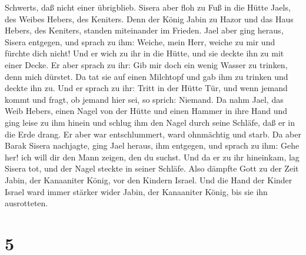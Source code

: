 Schwerts, daß nicht einer übrigblieb.  Sisera aber floh zu
Fuß in die Hütte Jaels, des Weibes Hebers, des Keniters. Denn der König
Jabin zu Hazor und das Haus Hebers, des Keniters, standen miteinander im
Frieden.  Jael aber ging heraus, Sisera entgegen, und
sprach zu ihm: Weiche, mein Herr, weiche zu mir und fürchte dich nicht!
Und er wich zu ihr in die Hütte, und sie deckte ihn zu mit einer Decke.
 Er aber sprach zu ihr: Gib mir doch ein wenig Wasser zu
trinken, denn mich dürstet. Da tat sie auf einen Milchtopf und gab ihm
zu trinken und deckte ihn zu.  Und er sprach zu ihr: Tritt
in der Hütte Tür, und wenn jemand kommt und fragt, ob jemand hier sei,
so sprich: Niemand.  Da nahm Jael, das Weib Hebers, einen
Nagel von der Hütte und einen Hammer in ihre Hand und ging leise zu ihm
hinein und schlug ihm den Nagel durch seine Schläfe, daß er in die Erde
drang. Er aber war entschlummert, ward ohnmächtig und starb.
 Da aber Barak Sisera nachjagte, ging Jael heraus, ihm
entgegen, und sprach zu ihm: Gehe her! ich will dir den Mann zeigen, den
du suchst. Und da er zu ihr hineinkam, lag Sisera tot, und der Nagel
steckte in seiner Schläfe.  Also dämpfte Gott zu der Zeit
Jabin, der Kanaaniter König, vor den Kindern Israel.  Und
die Hand der Kinder Israel ward immer stärker wider Jabin, der
Kanaaniter König, bis sie ihn ausrotteten.

\hypertarget{section-4}{%
\section{5}\label{section-4}}

